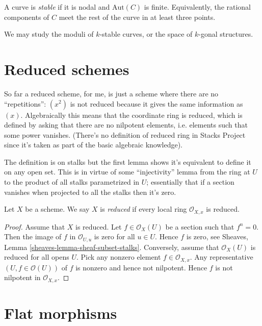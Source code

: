 \documentclass{book}
\begin{document}
A curve is {\it stable} if it is nodal and
$\text{Aut}(C)$ is finite.
Equivalently, the rational components of $C$
meet the
rest of the curve in at least three points.

We may study the moduli of $k$-stable curves,
or the space of $k$-gonal structures.

\section{Reduced schemes}
\label{section-reduced}

\noindent
So far a reduced scheme,
for me,
is just a scheme where there are
no ``repetitions'':
$(x^2)$ is not reduced because
it gives the same information as $(x)$.
Algebraically this means that the
coordinate ring is reduced,
which is defined by asking
that there are no nilpotent elements,
i.e. elements such that some power vanishes.
(There's no definition of reduced ring in
Stacks Project
since it's taken as part of the basic
algebraic knowledge).

The definition is on stalks but the first
lemma
shows it's equivalent to define it on any
open set.
This is in virtue of some ``injectivity''
lemma
from the ring at $U$ to the product of all
stalks parametrized in $U$;
essentially that if a section vanishes when
projected to all
the stalks then it's zero.

\begin{definition}
\label{definition-reduced}
Let $X$ be a scheme. We say $X$ is {\it
reduced} if every local ring
$\mathcal{O}_{X, x}$ is reduced.
\end{definition}


\begin{proof}
Assume that $X$ is reduced.
Let $f \in \mathcal{O}_X(U)$ be a section
such that $f^n = 0$.
Then the image of $f$ in $\mathcal{O}_{U, u}$
is zero for
all $u \in U$. Hence $f$ is zero, see
Sheaves, Lemma
\ref{sheaves-lemma-sheaf-subset-stalks}.
Conversely, assume that $\mathcal{O}_X(U)$ is
reduced
for all opens $U$. Pick any nonzero element
$f \in \mathcal{O}_{X, x}$.
Any representative $(U, f \in
\mathcal{O}(U))$  of $f$ is nonzero and
hence not nilpotent. Hence $f$ is not
nilpotent in $\mathcal{O}_{X, x}$.
\end{proof}

\section{Flat morphisms}
\label{section-flat-morphisms}
\end{document}
